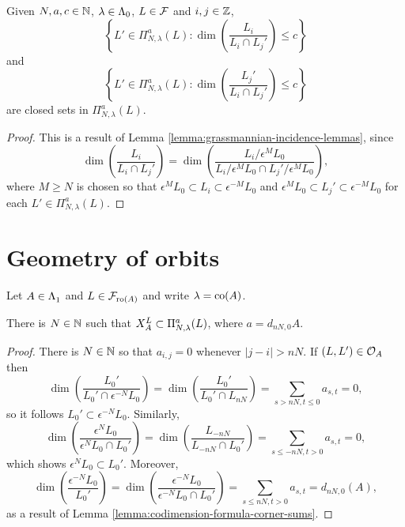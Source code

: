 \documentclass[a4paper, 11pt]{report}
\begin{document}
\begin{lemma}\label{lemma:incidence-varieties-consequences}
Given $N,a,c\in\naturals$, $\lambda\in\compositions$, $L\in\flags$ and $i,j\in\integers$,
\begin{equation*}
\left\{L'\in\Pi_{N,\lambda}^a(L):\dim\left(\frac{L_i}{L_i\cap L_j'}\right)\le c\right\}
\end{equation*}
and
\begin{equation*}
\left\{L'\in\Pi_{N,\lambda}^a(L): \dim\left(\frac{L_j'}{L_i\cap L_j'}\right)\le c\right\}
\end{equation*}
are closed sets in $\Pi_{N,\lambda}^a(L)$.
\end{lemma}

\begin{proof}
This is a result of Lemma \ref{lemma:grassmannian-incidence-lemmas}, since
\begin{equation*}
\dim\left(\frac{L_i}{L_i\cap L_j'}\right) = \dim\left(\frac{L_i/{\epsilon^M L_0}}{L_i/{\epsilon^M L_0}\cap L_j'/{\epsilon^M L_0}}\right),
\end{equation*}
where $M\geq N$ is chosen so that $\epsilon^M L_0\subset L_i\subset\epsilon^{-M}L_0$ and $\epsilon^M L_0\subset L_j'\subset\epsilon^{-M}L_0$ for each $L'\in\Pi_{N,\lambda}^a(L)$.
\end{proof}


\section{Geometry of orbits}

Let $A\in\matrices$ and $L\in\flags_{\ro{A}}$ and write $\lambda=\co{A}$.

\begin{lemma}\label{lemma:bounded-orbits}
There is $N\in\naturals$ such that $\xprod[L]{A}\subset\Pi_{N,\lambda}^a(L)$, where $a=d_{nN,0}{A}$.
\end{lemma}

\begin{proof}
There is $N\in\naturals$ so that $a_{i,j}=0$ whenever $|j-i|>nN$. If $(L,L')\in\orbit{A}$ then
\begin{equation*}
\dim\left(\frac{L_0'}{L_0'\cap\epsilon^{-N}L_0}\right) = \dim\left(\frac{L_0'}{L_0'\cap L_{nN}}\right) = \sum_{s>nN,t\le 0} a_{s,t} = 0,
\end{equation*}
so it follows $L_0'\subset\epsilon^{-N}L_0$. Similarly,
\begin{equation*}
\dim\left(\frac{\epsilon^N L_0}{\epsilon^N L_0\cap L_0'}\right) = \dim\left(\frac{L_{-nN}}{L_{-nN}\cap L_0'}\right) = \sum_{s\le -nN,t>0} a_{s,t} = 0,
\end{equation*}
which shows $\epsilon^N L_0\subset L_0'$. Moreover,
\begin{equation*}
\dim\left(\frac{\epsilon^{-N}L_0}{L_0'}\right) = \dim\left(\frac{\epsilon^{-N}L_0}{\epsilon^{-N}L_0\cap L_0'}\right) = \sum_{s\le nN,t>0}a_{s,t} = d_{nN,0}(A),
\end{equation*}
as a result of Lemma \ref{lemma:codimension-formula-corner-sums}. 
\end{proof}
\end{document}
